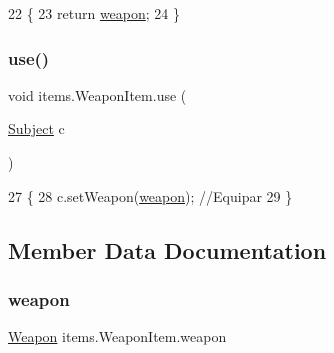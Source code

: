 \begin{DoxyCode}
22     \{
23         \textcolor{keywordflow}{return} \mbox{\hyperlink{classitems_1_1_weapon_item_ac409bfd1c448db978d0ebc4ed3a594a6}{weapon}};
24     \}
\end{DoxyCode}
\mbox{\label{classitems_1_1_weapon_item_acea8bd206dd0007a915a855d3fbde071}} 
\subsubsection{\texorpdfstring{use()}{use()}}
{\footnotesize\ttfamily void items.\+Weapon\+Item.\+use (\begin{DoxyParamCaption}\item[{\mbox{\hyperlink{classentities_1_1_subject}{Subject}}}]{c }\end{DoxyParamCaption})\hspace{0.3cm}{\ttfamily [inline]}}


\begin{DoxyCode}
27                                \{
28         c.setWeapon(\mbox{\hyperlink{classitems_1_1_weapon_item_ac409bfd1c448db978d0ebc4ed3a594a6}{weapon}});   \textcolor{comment}{//Equipar}
29     \}
\end{DoxyCode}


\subsection{Member Data Documentation}
\mbox{\label{classitems_1_1_weapon_item_ac409bfd1c448db978d0ebc4ed3a594a6}} 
\subsubsection{\texorpdfstring{weapon}{weapon}}
{\footnotesize\ttfamily \mbox{\hyperlink{classitems_1_1weapons_1_1_weapon}{Weapon}} items.\+Weapon\+Item.\+weapon\hspace{0.3cm}{\ttfamily [private]}}

